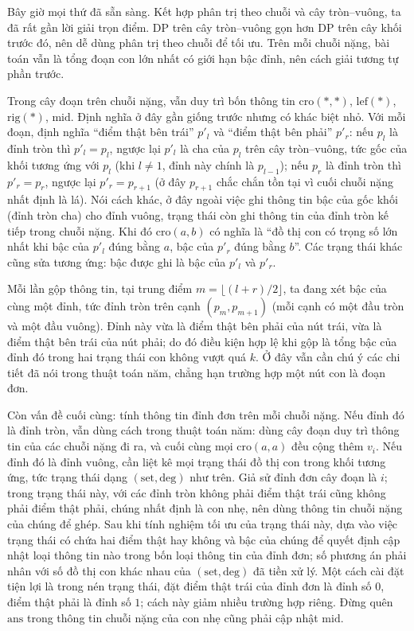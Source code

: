 \documentclass[11pt]{article}
\begin{document}
Bây giờ mọi thứ đã sẵn sàng. Kết hợp phân trị theo chuỗi và cây tròn--vuông,
ta đã rất gần lời giải trọn điểm. DP trên cây tròn--vuông gọn hơn DP trên cây
khối trước đó, nên dễ dùng phân trị theo chuỗi để tối ưu. Trên mỗi chuỗi nặng,
bài toán vẫn là tổng đoạn con lớn nhất có giới hạn bậc đỉnh, nên cách giải
tương tự phần trước.

Trong cây đoạn trên chuỗi nặng, vẫn duy trì bốn thông tin
\(\mathrm{cro}(*,*)\), \(\mathrm{lef}(*)\), \(\mathrm{rig}(*)\),
\(\mathrm{mid}\). Định nghĩa ở đây gần giống trước nhưng có khác biệt nhỏ. Với
mỗi đoạn, định nghĩa ``điểm thật bên trái'' \(p'_l\) và ``điểm thật bên phải''
\(p'_r\): nếu \(p_l\) là đỉnh tròn thì \(p'_l=p_l\), ngược lại \(p'_l\) là cha
của \(p_l\) trên cây tròn--vuông, tức gốc của khối tương ứng với \(p_l\) (khi
\(l\ne 1\), đỉnh này chính là \(p_{l-1}\)); nếu \(p_r\) là đỉnh tròn thì
\(p'_r=p_r\), ngược lại \(p'_r=p_{r+1}\) (ở đây \(p_{r+1}\) chắc chắn tồn tại
vì cuối chuỗi nặng nhất định là lá). Nói cách khác, ở đây ngoài việc ghi thông
tin bậc của gốc khối (đỉnh tròn cha) cho đỉnh vuông, trạng thái còn ghi thông
tin của đỉnh tròn kế tiếp trong chuỗi nặng. Khi đó \(\mathrm{cro}(a,b)\) có
nghĩa là ``đồ thị con có trọng số lớn nhất khi bậc của \(p'_l\) đúng bằng
\(a\), bậc của \(p'_r\) đúng bằng \(b\)''. Các trạng thái khác cũng sửa tương
ứng: bậc được ghi là bậc của \(p'_l\) và \(p'_r\).

Mỗi lần gộp thông tin, tại trung điểm \(m=\lfloor(l+r)/2\rfloor\), ta đang xét
bậc của cùng một đỉnh, tức đỉnh tròn trên cạnh \((p_m,p_{m+1})\) (mỗi cạnh có
một đầu tròn và một đầu vuông). Đỉnh này vừa là điểm thật bên phải của nút
trái, vừa là điểm thật bên trái của nút phải; do đó điều kiện hợp lệ khi gộp
là tổng bậc của đỉnh đó trong hai trạng thái con không vượt quá \(k\). Ở đây
vẫn cần chú ý các chi tiết đã nói trong thuật toán năm, chẳng hạn trường hợp
một nút con là đoạn đơn.

Còn vấn đề cuối cùng: tính thông tin đỉnh đơn trên mỗi chuỗi nặng. Nếu đỉnh
đó là đỉnh tròn, vẫn dùng cách trong thuật toán năm: dùng cây đoạn duy trì
thông tin của các chuỗi nặng đi ra, và cuối cùng mọi \(\mathrm{cro}(a,a)\) đều
cộng thêm \(v_i\). Nếu đỉnh đó là đỉnh vuông, cần liệt kê mọi trạng thái đồ thị
con trong khối tương ứng, tức trạng thái dạng \((\mathrm{set},\mathrm{deg})\)
như trên. Giả sử đỉnh đơn cây đoạn là \(i\); trong trạng thái này, với các
đỉnh tròn không phải điểm thật trái cũng không phải điểm thật phải, chúng nhất
định là con nhẹ, nên dùng thông tin chuỗi nặng của chúng để ghép. Sau khi tính
nghiệm tối ưu của trạng thái này, dựa vào việc trạng thái có chứa hai điểm thật
hay không và bậc của chúng để quyết định cập nhật loại thông tin nào trong bốn
loại thông tin của đỉnh đơn; số phương án phải nhân với số đồ thị con khác
nhau của \((\mathrm{set},\mathrm{deg})\) đã tiền xử lý. Một cách cài đặt tiện
lợi là trong nén trạng thái, đặt điểm thật trái của đỉnh đơn là đỉnh số \(0\),
điểm thật phải là đỉnh số \(1\); cách này giảm nhiều trường hợp riêng. Đừng
quên \(\mathrm{ans}\) trong thông tin chuỗi nặng của con nhẹ cũng phải cập
nhật \(\mathrm{mid}\).
\end{document}
